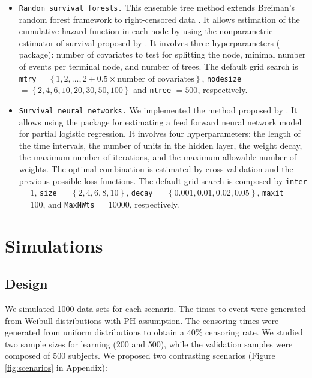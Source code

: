 \begin{itemize}
\item
  \texttt{Random\ survival\ forests.} This ensemble tree method extends Breiman's random forest framework to right-censored data \citep{ishwaranRandomSurvivalForests2008a}. It allows estimation of the cumulative hazard function in each node by using the nonparametric estimator of survival proposed by \citet{aalen1979}. It involves three hyperparameters ( package): number of covariates to test for splitting the node, minimal number of events per terminal node, and number of trees. The default grid search is \texttt{mtry} = \(\left \lbrace 1,2,...,2+0.5\times \textrm{number of covariates} \right \rbrace\), \texttt{nodesize} \(= \left \lbrace 2, 4, 6, 10, 20, 30, 50, 100 \right \rbrace\) and \texttt{ntree} \(= 500\), respectively.
\item
  \texttt{Survival\ neural\ networks.} We implemented the method proposed by \citet{biganzoli_feed_1998}. It allows using the  package for estimating a feed forward neural network model for partial logistic regression. It involves four hyperparameters: the length of the time intervals, the number of units in the hidden layer, the weight decay, the maximum number of iterations, and the maximum allowable number of weights. The optimal combination is estimated by cross-validation and the previous possible loss functions. The default grid search is composed by \texttt{inter} \(= 1\), \texttt{size} \(= \left \lbrace 2, 4, 6, 8, 10 \right \rbrace\), \texttt{decay} \(= \left \lbrace 0.001, 0.01, 0.02, 0.05 \right \rbrace\), \texttt{maxit} \(= 100\), and \texttt{MaxNWts} \(= 10000\), respectively.
\end{itemize}

\hypertarget{simulations}{%
\section{Simulations}\label{simulations}}

\hypertarget{design}{%
\subsection{Design}\label{design}}

We simulated 1000 data sets for each scenario. The times-to-event were generated from Weibull distributions with PH assumption. The censoring times were generated from uniform distributions to obtain a 40\% censoring rate. We studied two sample sizes for learning (200 and 500), while the validation samples were composed of 500 subjects. We proposed two contrasting scenarios (Figure \ref{fig:scenarios} in Appendix):

